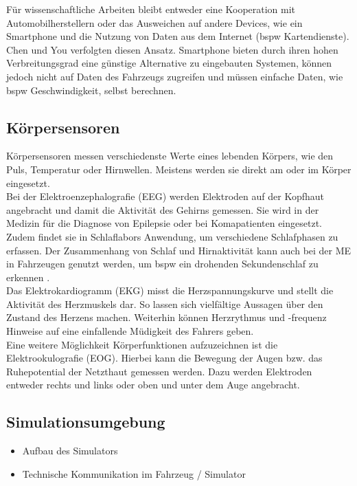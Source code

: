 {Für wissenschaftliche Arbeiten bleibt entweder eine Kooperation mit Automobilherstellern oder das Ausweichen auf andere Devices, wie ein Smartphone und die Nutzung von Daten aus dem Internet (\acl{bspw} Kartendienste). Chen \cite{Chen:2015:ISV:2742647.2742659} und You \cite{You:2013:CAA:2462456.2465428} verfolgten diesen Ansatz. Smartphone bieten durch ihren hohen Verbreitungsgrad eine günstige Alternative zu eingebauten Systemen, können jedoch nicht auf Daten des Fahrzeugs zugreifen und müssen einfache Daten, wie \acl{bspw} Geschwindigkeit, selbst berechnen.

\subsection{Körpersensoren}
\label{sec:sens}
Körpersensoren messen verschiedenste Werte eines lebenden Körpers, wie den Puls, Temperatur oder Hirnwellen. Meistens werden sie direkt am oder im Körper eingesetzt.\\

Bei der Elektroenzephalografie (EEG) werden Elektroden auf der Kopfhaut angebracht und damit die Aktivität des Gehirns gemessen. Sie wird in der Medizin für die Diagnose von Epilepsie oder bei Komapatienten eingesetzt. Zudem findet sie in Schlaflabors Anwendung, um verschiedene Schlafphasen zu erfassen. Der Zusammenhang von Schlaf und Hirnaktivität kann auch bei der \acl{ME} in Fahrzeugen genutzt werden, um \acl{bspw} ein drohenden Sekundenschlaf zu erkennen \cite{Santamaria_eeg}.\\

Das Elektrokardiogramm (EKG) misst die Herzspannungskurve und stellt die Aktivität des Herzmuskels dar. So lassen sich vielfältige Aussagen über den Zustand des Herzens machen. Weiterhin können Herzrythmus und -frequenz Hinweise auf eine einfallende Müdigkeit des Fahrers geben. \\

Eine weitere Möglichkeit Körperfunktionen aufzuzeichnen ist die Elektrookulografie (EOG). Hierbei kann die Bewegung der Augen bzw. das Ruhepotential der Netzthaut gemessen werden. Dazu werden Elektroden entweder rechts und links oder oben und unter dem Auge angebracht.


\subsection{Simulationsumgebung}
\label{sec:sim}
\begin{itemize}
  \item Aufbau des Simulators
  \item Technische Kommunikation im Fahrzeug / Simulator \cite{serial}
\end{itemize}



}
